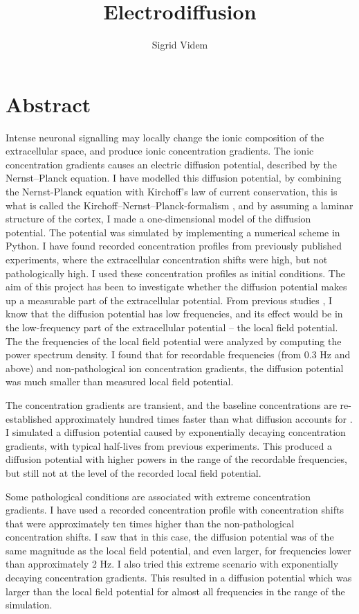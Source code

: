 \documentclass{article}
\author{Sigrid Videm}
\title{Electrodiffusion}
\begin{document}
\maketitle


\section{Abstract} 
Intense neuronal signalling may locally change the ionic composition of the extracellular space, and produce ionic concentration gradients. The ionic concentration gradients causes an electric diffusion potential, described by the Nernst--Planck equation. I have modelled this diffusion potential, by combining the Nernst-Planck equation with Kirchoff's law of current conservation, this is what is called the Kirchoff--Nernst--Planck-formalism \cite{Halnes2013}\cite{Halnes2016}, and by assuming a laminar structure of the cortex, I made a one-dimensional model of the diffusion potential. The potential was simulated by implementing a numerical scheme in Python. I have found recorded concentration profiles from previously published experiments, where the extracellular concentration shifts were high, but not pathologically high. I used these concentration profiles as initial conditions. The aim of this project has been to investigate whether the diffusion potential makes up a measurable part of the extracellular potential. From previous studies \cite{Halnes2016}\cite{Gratiy2017}, I know that the diffusion potential has low frequencies, and its effect would be in the low-frequency part of the extracellular potential -- the local field potential. The the frequencies of the local field potential were analyzed by computing the power spectrum density. I found that for recordable frequencies (from 0.3 Hz and above) and non-pathological ion concentration gradients, the diffusion potential was much smaller than measured local field potential. 

The concentration gradients are transient, and the baseline concentrations are re-established approximately hundred times faster than what diffusion accounts for \cite{CordingleySomjen}. I simulated a diffusion potential caused by exponentially decaying concentration gradients, with typical half-lives from previous experiments. This produced a diffusion potential with higher powers in the range of the recordable frequencies, but still not at the level of the recorded local field potential. 

Some pathological conditions are associated with extreme concentration gradients. I have used a recorded concentration profile with concentration shifts that were approximately ten times higher than the non-pathological concentration shifts. I saw that in this case, the diffusion potential was of the same magnitude as the local field potential, and even larger, for frequencies lower than approximately 2 Hz. I also tried this extreme scenario with exponentially decaying concentration gradients. This resulted in a diffusion potential which was larger than the local field potential for almost all frequencies in the range of the simulation. 
\end{document}
